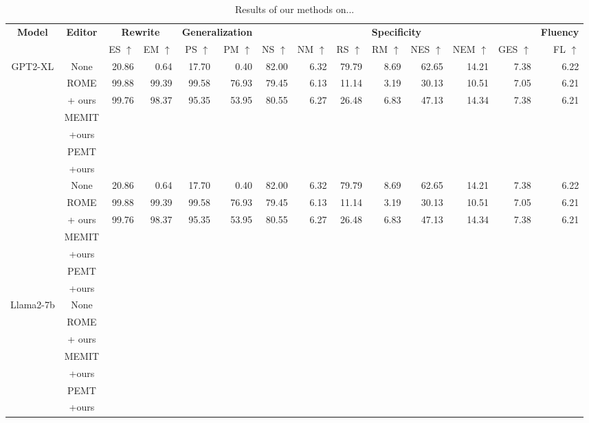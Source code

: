 \addtolength{\tabcolsep}{2pt}

\begin{table*}[!htbp]
    \centering
    \tiny
    \caption{Results of our methods on...}
    \label{tab:main}
    \begin{adjustbox}{width=1\textwidth}
    \begin{tabular}{ccrrrrrrrrrrrr}
    \toprule
         \multicolumn{1}{c}{\textbf{Model}}&\multicolumn{1}{c}{\textbf{Editor}} & \multicolumn{2}{c}{\textbf{Rewrite}} & \multicolumn{2}{c}{\textbf{Generalization}} & \multicolumn{7}{c}{\textbf{Specificity}} & \multicolumn{1}{c}{\textbf{Fluency}} \\
        \cmidrule(lr){3-4}\cmidrule(lr){5-6}\cmidrule(lr){7-13}\cmidrule(lr){14-14}
        && ES $\uparrow$ & EM $\uparrow$ & PS $\uparrow$ & PM $\uparrow$ & NS $\uparrow$ & NM $\uparrow$ & RS $\uparrow$ & RM $\uparrow$ & NES $\uparrow$ & NEM $\uparrow$ & GES $\uparrow$ & FL $\uparrow$\\
        \midrule
    \multirow{8}{*}{GPT2-XL} 
    &None&20.86&0.64 & 17.70&0.40 &82.00 &6.32 & 79.79&8.69 & 62.65& 14.21 & 7.38 & 6.22  \\
    \cmidrule(lr){2-14}
    &ROME& 99.88 & 99.39 & 99.58 & 76.93& 79.45&6.13 & 11.14&3.19 & 30.13& 10.51 &7.05 & 6.21  \\
    &+ ours&99.76&98.37 & 95.35& 53.95& 80.55& 6.27& 26.48& 6.83& 47.13& 14.34 &7.38 & 6.21  \\
    \cmidrule(lr){2-14}
    & MEMIT \\
    & +ours \\
    \cmidrule(lr){2-14}
    & PEMT \\
    & +ours \\
    \cmidrule(lr){1-14}
    \multirow{8}{*}{GPT-J} 
    &None&20.86&0.64 & 17.70&0.40 &82.00 &6.32 & 79.79&8.69 & 62.65& 14.21 & 7.38 & 6.22  \\
    \cmidrule(lr){2-14}
    &ROME& 99.88 & 99.39 & 99.58 & 76.93& 79.45&6.13 & 11.14&3.19 & 30.13& 10.51 &7.05 & 6.21  \\
    &+ ours&99.76&98.37 & 95.35& 53.95& 80.55& 6.27& 26.48& 6.83& 47.13& 14.34 &7.38 & 6.21  \\
    \cmidrule(lr){2-14}
    & MEMIT \\
    & +ours \\
    \cmidrule(lr){2-14}
    & PEMT \\
    & +ours \\
    \cmidrule(lr){1-14}
    \multirow{8}{*}{Llama2-7b} 
    &None  \\
    \cmidrule(lr){2-14}
    &ROME  \\
    &+ ours  \\
    \cmidrule(lr){2-14}
    & MEMIT \\
    & +ours \\
    \cmidrule(lr){2-14}
    & PEMT \\
    & +ours \\
    \bottomrule
    \end{tabular}
    \end{adjustbox}
\end{table*}%

\addtolength{\tabcolsep}{-2pt}